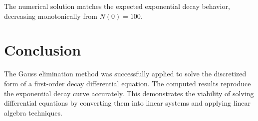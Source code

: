 The numerical solution matches the expected exponential decay behavior, decreasing monotonically from $N(0) = 100$.

\section*{Conclusion} 
The Gauss elimination method was successfully applied to solve the discretized form of a first-order decay differential equation. The computed results reproduce the exponential decay curve accurately. This demonstrates the viability of solving differential equations by converting them into linear systems and applying linear algebra techniques.

